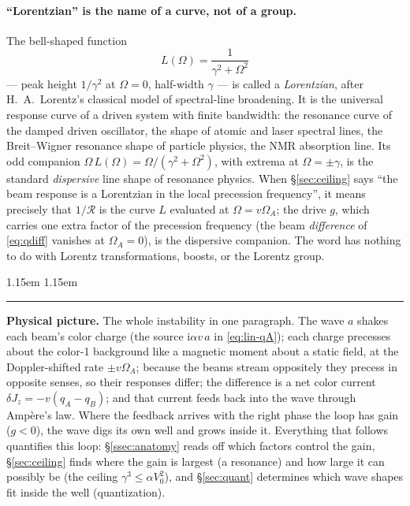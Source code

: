\documentclass[11pt,a4paper]{article}
\numberwithin{equation}{section}
\theoremstyle{remark}
\newenvironment{intuition}%
{\par\medskip\noindent
 \begin{list}{}{\leftmargin 1.15em \rightmargin 1.15em \listparindent 0pt
 \itemindent 0pt \parsep 2pt \topsep 2pt}\item\relax
 \small\textcolor{intu}{\rule[-0.6ex]{2.6pt}{2.4ex}}\hspace{0.55em}%
 \textcolor{intu}{\textbf{Physical picture.}}\hspace{0.5em}\ignorespaces}%
{\end{list}\medskip}
\newcommand{\Vo}{V_0}
\newcommand{\OmA}{\Omega_A}
\newcommand{\R}{\mathcal{R}}
\newcommand{\ii}{\mathrm{i}}
\begin{document}
\paragraph{``Lorentzian'' is the name of a curve, not of a group.}
The bell-shaped function
\begin{equation}
L(\Omega)=\frac{1}{\gamma^2+\Omega^2}
\label{eq:lorentzian}
\end{equation}
--- peak height $1/\gamma^2$ at $\Omega=0$, half-width $\gamma$ --- is
called a \emph{Lorentzian}, after H.~A.~Lorentz's classical model of
spectral-line broadening. It is the universal response curve of a driven
system with finite bandwidth: the resonance curve of the damped driven
oscillator, the shape of atomic and laser spectral lines, the
Breit--Wigner resonance shape of particle physics, the NMR absorption
line. Its odd companion $\Omega\,L(\Omega)=\Omega/(\gamma^2+\Omega^2)$,
with extrema at $\Omega=\pm\gamma$, is the standard \emph{dispersive}
line shape of resonance physics. When \S\ref{sec:ceiling} says ``the
beam response is a Lorentzian in the local precession frequency'', it
means precisely that $1/\R$ is the curve $L$ evaluated at
$\Omega=v\OmA$; the drive $g$, which carries one extra factor of the
precession frequency (the beam \emph{difference} of \eqref{eq:qdiff}
vanishes at $\OmA=0$), is the dispersive companion. The word has nothing
to do with Lorentz transformations, boosts, or the Lorentz group.

\begin{intuition}
The whole instability in one paragraph. The wave $a$ shakes each beam's
color charge (the source $\ii\alpha v\,a$ in \eqref{eq:lin-qA}); each
charge precesses about the color-1 background like a magnetic moment
about a static field, at the Doppler-shifted rate $\pm v\OmA$; because
the beams stream oppositely they precess in opposite senses, so their
responses differ; the difference is a net color current
$\delta J_z=-v(q_A-q_B)$; and that current feeds back into the wave
through Amp\`ere's law. Where the feedback arrives with the right phase
the loop has gain ($g<0$), the wave digs its own well and grows inside
it. Everything that follows quantifies this loop:
\S\ref{ssec:anatomy} reads off which factors control the gain,
\S\ref{sec:ceiling} finds where the gain is largest (a resonance) and
how large it can possibly be (the ceiling $\gamma^3\le\alpha\Vo^2$), and
\S\ref{sec:quant} determines which wave shapes fit inside the well
(quantization).
\end{intuition}
\end{document}
